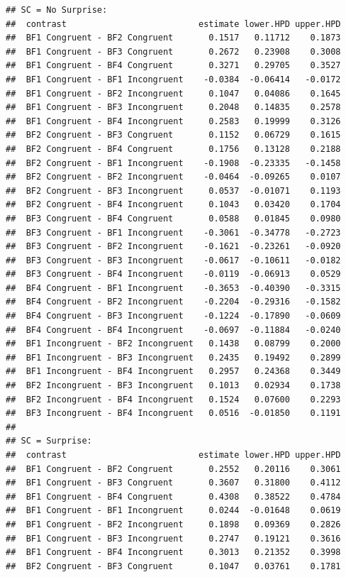 \documentclass[
]{article}
\begin{document}
\begin{verbatim}
## SC = No Surprise:
##  contrast                          estimate lower.HPD upper.HPD
##  BF1 Congruent - BF2 Congruent       0.1517   0.11712    0.1873
##  BF1 Congruent - BF3 Congruent       0.2672   0.23908    0.3008
##  BF1 Congruent - BF4 Congruent       0.3271   0.29705    0.3527
##  BF1 Congruent - BF1 Incongruent    -0.0384  -0.06414   -0.0172
##  BF1 Congruent - BF2 Incongruent     0.1047   0.04086    0.1645
##  BF1 Congruent - BF3 Incongruent     0.2048   0.14835    0.2578
##  BF1 Congruent - BF4 Incongruent     0.2583   0.19999    0.3126
##  BF2 Congruent - BF3 Congruent       0.1152   0.06729    0.1615
##  BF2 Congruent - BF4 Congruent       0.1756   0.13128    0.2188
##  BF2 Congruent - BF1 Incongruent    -0.1908  -0.23335   -0.1458
##  BF2 Congruent - BF2 Incongruent    -0.0464  -0.09265    0.0107
##  BF2 Congruent - BF3 Incongruent     0.0537  -0.01071    0.1193
##  BF2 Congruent - BF4 Incongruent     0.1043   0.03420    0.1704
##  BF3 Congruent - BF4 Congruent       0.0588   0.01845    0.0980
##  BF3 Congruent - BF1 Incongruent    -0.3061  -0.34778   -0.2723
##  BF3 Congruent - BF2 Incongruent    -0.1621  -0.23261   -0.0920
##  BF3 Congruent - BF3 Incongruent    -0.0617  -0.10611   -0.0182
##  BF3 Congruent - BF4 Incongruent    -0.0119  -0.06913    0.0529
##  BF4 Congruent - BF1 Incongruent    -0.3653  -0.40390   -0.3315
##  BF4 Congruent - BF2 Incongruent    -0.2204  -0.29316   -0.1582
##  BF4 Congruent - BF3 Incongruent    -0.1224  -0.17890   -0.0609
##  BF4 Congruent - BF4 Incongruent    -0.0697  -0.11884   -0.0240
##  BF1 Incongruent - BF2 Incongruent   0.1438   0.08799    0.2000
##  BF1 Incongruent - BF3 Incongruent   0.2435   0.19492    0.2899
##  BF1 Incongruent - BF4 Incongruent   0.2957   0.24368    0.3449
##  BF2 Incongruent - BF3 Incongruent   0.1013   0.02934    0.1738
##  BF2 Incongruent - BF4 Incongruent   0.1524   0.07600    0.2293
##  BF3 Incongruent - BF4 Incongruent   0.0516  -0.01850    0.1191
## 
## SC = Surprise:
##  contrast                          estimate lower.HPD upper.HPD
##  BF1 Congruent - BF2 Congruent       0.2552   0.20116    0.3061
##  BF1 Congruent - BF3 Congruent       0.3607   0.31800    0.4112
##  BF1 Congruent - BF4 Congruent       0.4308   0.38522    0.4784
##  BF1 Congruent - BF1 Incongruent     0.0244  -0.01648    0.0619
##  BF1 Congruent - BF2 Incongruent     0.1898   0.09369    0.2826
##  BF1 Congruent - BF3 Incongruent     0.2747   0.19121    0.3616
##  BF1 Congruent - BF4 Incongruent     0.3013   0.21352    0.3998
##  BF2 Congruent - BF3 Congruent       0.1047   0.03761    0.1781

\end{verbatim}
\end{document}
